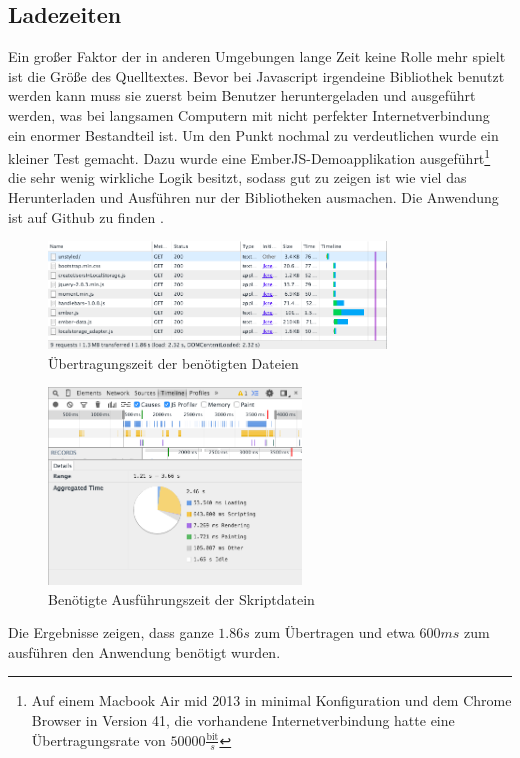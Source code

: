 \documentclass[12pt,twoside]{book}
\begin{document}
\subsection{Ladezeiten}\label{sec:loadingtimes}

Ein großer Faktor der in anderen Umgebungen lange Zeit keine Rolle mehr spielt ist die Größe des Quelltextes. Bevor bei Javascript irgendeine Bibliothek benutzt werden kann muss sie zuerst beim Benutzer heruntergeladen und ausgeführt werden, was bei langsamen Computern mit nicht perfekter Internetverbindung ein enormer Bestandteil ist. Um den Punkt nochmal zu verdeutlichen wurde ein kleiner Test gemacht. Dazu wurde eine EmberJS-Demoapplikation ausgeführt\footnote{Auf einem Macbook Air mid 2013 in minimal Konfiguration und dem Chrome Browser in Version 41, die vorhandene Internetverbindung hatte eine Übertragungsrate von $50000 \frac{\text{bit}}{s}$} die sehr wenig wirkliche Logik besitzt, sodass gut zu zeigen ist wie viel das Herunterladen und Ausführen nur der Bibliotheken ausmachen.
Die Anwendung ist auf Github zu finden \cite{embercrud}.
\begin{figure}[htbp]
    \centering
    \includegraphics[width=0.8\textwidth]{images/performance_1.png}
    \caption{Übertragungszeit der benötigten Dateien}
    \label{fig:loadtimes}
\end{figure}
\begin{figure}[htbp]
    \centering
    \includegraphics[width=0.6\textwidth]{images/performance_2.png}
    \caption{Benötigte Ausführungszeit der Skriptdatein}
    \label{fig:executiontime}
\end{figure}
Die Ergebnisse zeigen, dass ganze $1.86s$ zum Übertragen und etwa $600ms$ zum ausführen den Anwendung benötigt wurden.
\end{document}

